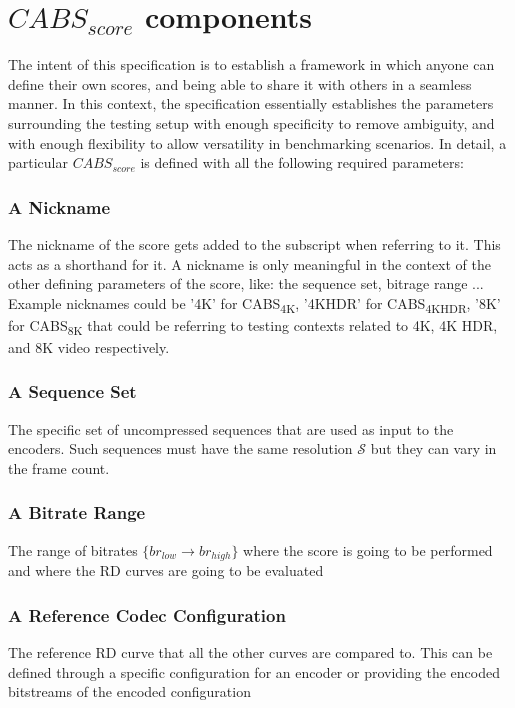\documentclass[12pt, conference, hidelinks, onecolumn]{IEEEtran}
\begin{document}
\section{$CABS_{score}$ components}
The intent of this specification is to establish a framework in which anyone can define their own scores, and being able to share it with others in a seamless manner. In this context, the specification essentially establishes the parameters surrounding the testing setup with enough specificity to remove ambiguity, and with enough flexibility to allow versatility in benchmarking scenarios. In detail, a particular $CABS_{score}$ is defined with all the following required parameters:

\subsubsection{A Nickname}
\label{subsec:nickname}
The nickname of the score gets added to the subscript when referring to it. This acts as a shorthand for it. A nickname is only meaningful in the context of the other defining parameters of the score, like: the sequence set, bitrage range ... Example nicknames could be '4K' for CABS\textsubscript{4K}, '4KHDR' for CABS\textsubscript{4KHDR}, '8K' for CABS\textsubscript{8K} that could be referring to testing contexts related to 4K, 4K HDR, and 8K video respectively. 


\subsubsection{A Sequence Set}
\label{subsec:sequenceset}
The specific set of uncompressed sequences that are used as input to the encoders. Such sequences must have the same resolution $\mathcal{S}$ but they can vary in the frame count.


\subsubsection{A Bitrate Range}
\label{subsec:bitraterange}
The range of bitrates $\lbrace br_{low} \to br_{high} \rbrace $ where the score is going to be performed and where the RD curves are going to be evaluated


\subsubsection{A Reference Codec Configuration}
\label{subsec:refcodecconfig}
The reference RD curve that all the other curves are compared to. This can be defined through a specific configuration for an encoder or providing the encoded bitstreams of the encoded configuration
\end{document}
